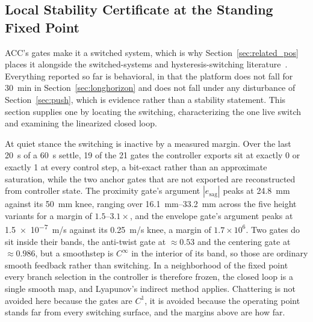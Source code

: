 \documentclass[a4paper,fleqn]{cas-dc}
\begin{document}
\subsection{Local Stability Certificate at the Standing Fixed Point}
\label{sec:stability}

ACC's gates make it a switched system, which is why Section~\ref{sec:related_pos} places it alongside the switched-systems and hysteresis-switching literature~\cite{liberzon2003switching,hespanha2003hysteresis}. Everything reported so far is behavioral, in that the platform does not fall for \SI{30}{min} in Section~\ref{sec:longhorizon} and does not fall under any disturbance of Section~\ref{sec:push}, which is evidence rather than a stability statement. This section supplies one by locating the switching, characterizing the one live switch and examining the linearized closed loop.

At quiet stance the switching is inactive by a measured margin. Over the last \SI{20}{s} of a \SI{60}{s} settle, \num{19} of the \num{21} gates the controller exports sit at exactly \num{0} or exactly \num{1} at every control step, a bit-exact rather than an approximate saturation, while the two anchor gates that are not exported are reconstructed from controller state. The proximity gate's argument $|e_{\text{sag}}|$ peaks at \SI{24.8}{mm} against its \SI{50}{mm} knee, ranging over \SIrange{16.1}{33.2}{mm} across the five height variants for a margin of $1.5$--$3.1{\times}$, and the envelope gate's argument peaks at \SI{1.5e-7}{m/s} against its \SI{0.25}{m/s} knee, a margin of $1.7{\times}10^{6}$. Two gates do sit inside their bands, the anti-twist gate at ${\approx}\num{0.53}$ and the centering gate at ${\approx}\num{0.986}$, but a smoothstep is $C^\infty$ in the interior of its band, so those are ordinary smooth feedback rather than switching. In a neighborhood of the fixed point every branch selection in the controller is therefore frozen, the closed loop is a single smooth map, and Lyapunov's indirect method applies. Chattering is not avoided here because the gates are $C^1$, it is avoided because the operating point stands far from every switching surface, and the margins above are how far.
\end{document}
